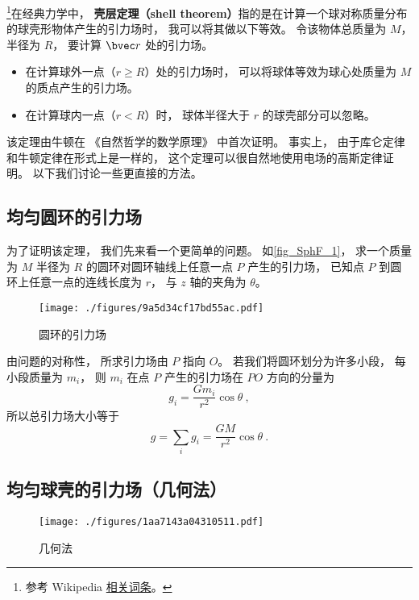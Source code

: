 

\footnote{参考 Wikipedia \href{https://en.wikipedia.org/wiki/Shell_theorem}{相关词条}。}在经典力学中， \textbf{壳层定理（shell theorem）}指的是在计算一个球对称质量分布的球壳形物体产生的引力场时， 我可以将其做以下等效。 令该物体总质量为 $M$， 半径为 $R$， 要计算 $\bvec r$ 处的引力场。
\begin{itemize}
\item 在计算球外一点（$r \geqslant R$）处的引力场时， 可以将球体等效为球心处质量为 $M$ 的质点产生的引力场。
\item 在计算球内一点（$r < R$）时， 球体半径大于 $r$ 的球壳部分可以忽略。
\end{itemize}

该定理由牛顿在 《自然哲学的数学原理》 中首次证明。 事实上， 由于库仑定律和牛顿定律在形式上是一样的， 这个定理可以很自然地使用电场的高斯定律证明。 以下我们讨论一些更直接的方法。

\subsection{均匀圆环的引力场}
为了证明该定理， 我们先来看一个更简单的问题。 如\autoref{fig_SphF_1}， 求一个质量为 $M$ 半径为 $R$ 的圆环对圆环轴线上任意一点 $P$ 产生的引力场， 已知点 $P$ 到圆环上任意一点的连线长度为 $r$， 与 $z$ 轴的夹角为 $\theta$。

\begin{figure}[ht]
\centering
\texttt{[image: ./figures/9a5d34cf17bd55ac.pdf]}
\caption{圆环的引力场} \label{fig_SphF_1}
\end{figure}

由问题的对称性， 所求引力场由 $P$ 指向 $O$。 若我们将圆环划分为许多小段， 每小段质量为 $m_i$， 则 $m_i$ 在点 $P$ 产生的引力场在 $PO$ 方向的分量为
\begin{equation}
g_i = \frac{Gm_i}{r^2}\cos\theta~,
\end{equation}
所以总引力场大小等于
\begin{equation}\label{eq_SphF_2}
g = \sum_i g_i = \frac{GM}{r^2}\cos\theta~.
\end{equation}

\subsection{均匀球壳的引力场（几何法）}\label{sub_SphF_1}

\begin{figure}[ht]
\centering
\texttt{[image: ./figures/1aa7143a04310511.pdf]}
\caption{几何法} \label{fig_SphF_2}
\end{figure}

